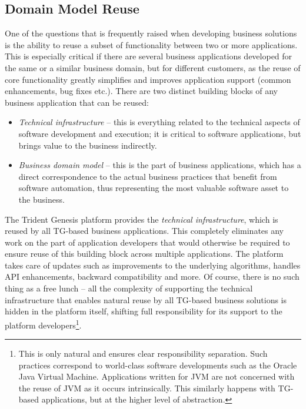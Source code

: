\subsection{Domain Model Reuse}
  One of the questions that is frequently raised when developing business solutions is the ability to reuse a subset of functionality between two or more applications.
  This is especially critical if there are several business applications developed for the same or a similar business domain, but for different customers, as the reuse of core functionality greatly simplifies and improves application support (common enhancements, bug fixes etc.).
  There are two distinct building blocks of any business application that can be reused:
  \begin{itemize}
   \item \emph{Technical infrastructure} -- this is everything related to the technical aspects of software development and execution; it is critical to software applications, but brings value to the business indirectly.
    \item \emph{Business domain model} --  this is the part of business applications, which has a direct correspondence to the actual business practices that benefit from software automation, thus representing the most valuable software asset to the business.
  \end{itemize}

  The Trident Genesis platform provides the \emph{technical infrastructure}, which is reused by all TG-based business applications.
  This completely eliminates any work on the part of application developers that would otherwise be required to ensure reuse of this building block across multiple applications.
  The platform takes care of updates such as improvements to the underlying algorithms, handles API enhancements, backward compatibility and more.
  Of course, there is no such thing as a free lunch -- all the complexity of supporting the technical infrastructure that enables natural reuse by all TG-based business solutions is hidden in the platform itself, shifting full responsibility for its support to the platform developers\footnote{This is only natural and ensures clear responsibility separation. Such practices correspond to world-class software developments such as the Oracle Java Virtual Machine. 
  Applications written for JVM are not concerned with the reuse of JVM as it occurs intrinsically. This similarly happens with TG-based applications, but at the higher level of abstraction.}.

